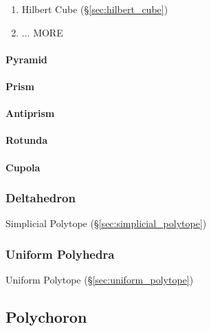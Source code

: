 \begin{enumerate}
  \item Hilbert Cube (\S\ref{sec:hilbert_cube})
  \item ... MORE
\end{enumerate}



\paragraph{Pyramid}\label{sec:pyramid}\hfill

\paragraph{Prism}\label{sec:prism}\hfill

\paragraph{Antiprism}\label{sec:antiprism}\hfill

\paragraph{Rotunda}\label{sec:rotunda}\hfill

\paragraph{Cupola}\label{sec:cupola}\hfill



\subsubsection{Deltahedron}\label{sec:deltahedron}

Simplicial Polytope (\S\ref{sec:simplicial_polytope})



\subsubsection{Uniform Polyhedra}\label{sec:uniform_polyhedra}

\fist Uniform Polytope (\S\ref{sec:uniform_polytope})



\subsection{Polychoron}\label{sec:polychoron}

